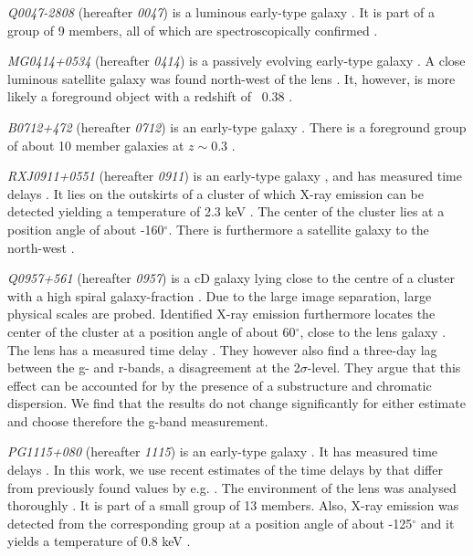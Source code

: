 \documentclass[useAMS,usenatbib]{mn2e}
\begin{document}
\textit{Q0047-2808} (hereafter \textit{0047}) is a luminous early-type galaxy \citep{1996MNRAS.278..139W}. It is part of a group of 9 members, all of which are spectroscopically confirmed \citep{2011ApJ...726...84W}.

\textit{MG0414+0534} (hereafter \textit{0414}) is a passively evolving early-type galaxy \citep{1999AJ....117.2034T}. A close luminous satellite galaxy was found north-west of the lens \citep{1993AJ....105....1S}. It, however, is more likely a foreground object with a redshift of ~0.38 \citep{2011MNRAS.413L..86C}.

\textit{B0712+472} (hereafter \textit{0712}) is an early-type galaxy \citep{1998MNRAS.296..483J,1998AJ....115..377F}. There is a foreground group of about 10 member galaxies at $z\sim0.3$ \citep{2002AJ....123..627F}.

\textit{RXJ0911+0551} (hereafter \textit{0911}) is an early-type galaxy \citep{1997A&A...317L..13B,2012A&A...538A..99S}, and has measured time delays \citep{2002ApJ...572L..11H}. It lies on the outskirts of a cluster of which X-ray emission can be detected yielding a temperature of 2.3 keV \citep{2001ApJ...555....1M}. The center of the cluster lies at a position angle of about -160$^{\circ}$. There is furthermore a satellite galaxy to the north-west \citep{2000ApJ...544L..35K}.

\textit{Q0957+561} (hereafter \textit{0957}) is a cD galaxy lying close to the centre of a cluster with a high spiral galaxy-fraction \citep[e.g.][]{1992MNRAS.254P..27G,1994A&A...291..411A,1998ApJ...504..661C}. Due to the large image separation, large physical scales are probed. Identified X-ray emission furthermore locates the center of the cluster at a position angle of about 60$^{\circ}$, close to the lens galaxy \citep{2002ApJ...565...96C}. The lens has a measured time delay \citep[e.g.][]{2012A&A...540A.132S}. They however also find a three-day lag between the g- and r-bands, a disagreement at the 2$\sigma$-level. They argue that this effect can be accounted for by the presence of a substructure and chromatic dispersion. We find that the results do not change significantly for either estimate and choose therefore the g-band measurement.

\textit{PG1115+080} (hereafter \textit{1115}) is an early-type galaxy \citep{1980Natur.285..641W,2005ApJ...626...51Y}. It has measured time delays \citep[see e.g.][]{1997ApJ...475L..85S}. In this work, we use recent estimates of the time delays by \citet{2010MNRAS.406.2764T} that differ from previously found values by e.g. \citet{1997ApJ...489...21B}. The environment of the lens was analysed thoroughly \citep{2006ApJ...641..169M,2011ApJ...726...84W}. It is part of a small group of 13 members. Also, X-ray emission was detected from the corresponding group at a position angle of about -125$^{\circ}$ and it yields a temperature of 0.8 keV \citep{2004ApJ...610..686G}.
\end{document}
